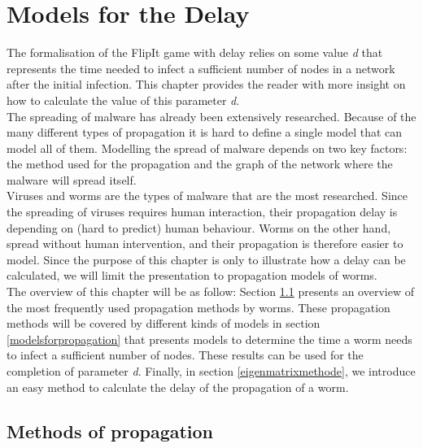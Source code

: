 \chapter{Models for the Delay}
\label{chapter4: Worm propagation}



The formalisation of the FlipIt game with delay relies on some value  \textit{d} that represents the time needed to infect a sufficient number of nodes in a network after the initial infection. This chapter provides the reader with more insight on how to calculate the value of this parameter \textit{d}.  \\

The  spreading of malware has already been extensively researched. Because of the many different types of propagation it is hard to define a single model that can model all of them. Modelling the spread of malware depends on two key factors: the method used for the propagation and the graph of the network where the malware will spread itself. \\
Viruses and worms are the types of malware that are the most researched. Since the spreading of viruses requires human interaction, their propagation delay is depending on (hard to predict) human behaviour. Worms on the other hand, spread without human intervention, and their propagation is therefore easier to model. Since the purpose of this chapter is only to illustrate how a delay can be calculated, we will limit the presentation to propagation models of worms. \\

The overview of this chapter will be as follow: Section \ref{methodsofpropagation} presents an overview of the most frequently used propagation methods by worms. These propagation methods will be covered by different kinds of models in section \ref{modelsforpropagation} that presents models to determine the time a worm needs to infect a sufficient number of nodes. These results can be used for the completion of parameter \textit{d}. Finally, in section \ref{eigenmatrixmethode},  we introduce an easy method to calculate the delay of the propagation of a worm. %



\section{Methods of propagation}
\label{methodsofpropagation}

